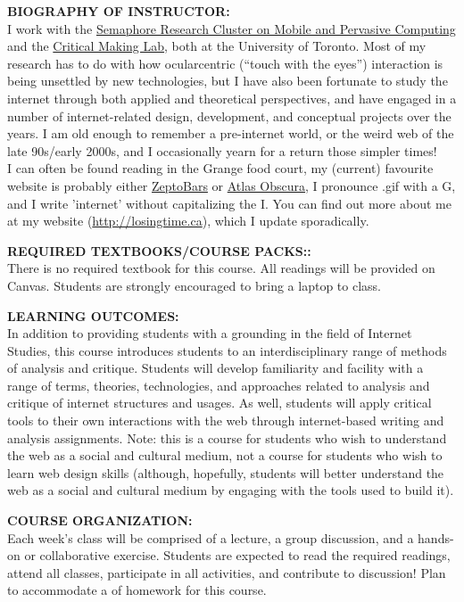 \documentclass[10pt]{article}
\begin{document}
\textbf{BIOGRAPHY OF INSTRUCTOR:}\\
I work with the \href{http://semaphore.utoronto.ca}{Semaphore Research Cluster on Mobile and Pervasive Computing} and the \href{http://criticalmaking.com}{Critical Making Lab}, both at the University of Toronto. Most of my research has to do with how ocularcentric (``touch with the eyes'') interaction is being unsettled by new technologies, but I have also been fortunate to study the internet through both applied and theoretical perspectives, and have engaged in a number of internet-related design, development, and conceptual projects over the years. I am old enough to remember a pre-internet world, or the weird web of the late 90s/early 2000s, and I occasionally yearn for a return those simpler times!\\ I can often be found reading in the Grange food court, my (current) favourite website is probably either \href{http://zeptobars.ru/en/}{ZeptoBars} or \href{http://www.atlasobscura.com/}{Atlas Obscura}, I pronounce .gif with a G, and I write 'internet' without capitalizing the I. You can find out more about me at my website (\href{http://losingtime.ca}{http://losingtime.ca}), which I update sporadically. 

\textbf{REQUIRED TEXTBOOKS/COURSE PACKS::}\\
There is no required textbook for this course. All readings will be provided on Canvas. Students are strongly encouraged to bring a laptop to class. 

\textbf{LEARNING OUTCOMES:}\\
In addition to providing students with a grounding in the field of Internet Studies, this course introduces students to an interdisciplinary range of methods of analysis and critique. Students will develop familiarity and facility with a range of terms, theories, technologies, and approaches related to analysis and critique of internet structures and usages. As well, students will apply critical tools to their own interactions with the web through internet-based writing and analysis assignments. Note: this is a course for students who wish to understand the web as a social and cultural medium, not a course for students who wish to learn web design skills (although, hopefully, students will better understand the web as a social and cultural medium by engaging with the tools used to build it). 

\textbf{COURSE ORGANIZATION:}\\
Each week's class will be comprised of a lecture, a group discussion, and a hands-on or collaborative exercise. Students are expected to read the required readings, attend all classes, participate in all activities, and contribute to discussion! Plan to accommodate a \underline{} of homework for this course. 
\end{document}
